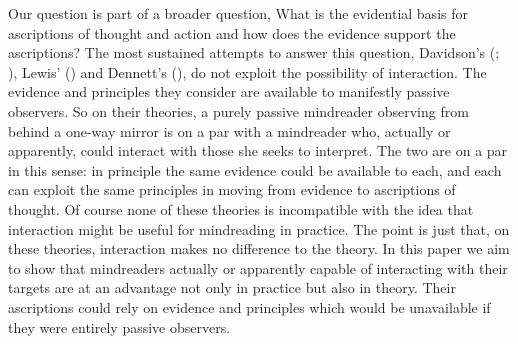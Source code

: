 \documentclass[14pt,a4paper]{extarticle}
\begin{document}
Our question is part of a broader question,
What is the evidential basis for ascriptions of thought and action and how does the evidence support the ascriptions?
The most sustained attempts to answer this question,
Davidson's (\citeyear{Davidson:1984wh}; \citeyear{Davidson:1990du}), Lewis' (\citeyear{lewis:1974ri}) and Dennett's (\citeyear{Dennett:1987sf}),
do not exploit the possibility of interaction.
The evidence and principles they consider are available to manifestly passive observers.
So on their theories,
a purely passive mindreader observing from behind a one-way mirror
is on a par with
a mindreader who, actually or apparently, could interact with those she seeks to interpret.
The two are on a par in this sense:
in principle the same evidence could be available to each, and each can exploit the same principles in moving from evidence to ascriptions of thought.
Of course none of these theories is incompatible with the idea that interaction might be useful for mindreading in practice.  
The point is just that, on these theories, interaction makes no difference to the theory.
In this paper we aim to show
that mindreaders actually or apparently capable of interacting with their targets are at an advantage not only in practice but also in theory.
Their ascriptions could rely on evidence and principles which would be unavailable if they were entirely passive observers.
\end{document}
